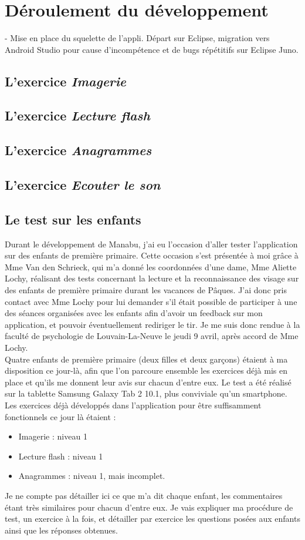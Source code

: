 \section{Déroulement du développement}
- Mise en place du squelette de l'appli. Départ sur Eclipse, migration vers Android Studio pour cause d'incompétence et de bugs répétitifs sur Eclipse Juno.

\subsection{L'exercice \textit{Imagerie}}
\subsection{L'exercice \textit{Lecture flash}}
\subsection{L'exercice \textit{Anagrammes}}
\subsection{L'exercice \textit{Ecouter le son}}
\subsection{Le test sur les enfants}
Durant le développement de Manabu, j'ai eu l'occasion d'aller tester l'application sur des enfants de première primaire. Cette occasion s'est présentée à moi grâce à Mme Van den Schrieck, qui m'a donné les coordonnées d'une dame, Mme Aliette Lochy, réalisant des tests concernant la lecture et la reconnaissance des visage sur des enfants de première primaire durant les vacances de Pâques. J'ai donc pris contact avec Mme Lochy pour lui demander s'il était possible de participer à une des séances organisées avec les enfants afin d'avoir un feedback sur mon application, et pouvoir éventuellement rediriger le tir. Je me suis donc rendue à la faculté de psychologie de Louvain-La-Neuve le jeudi 9 avril, après accord de Mme Lochy.\\

Quatre enfants de première primaire (deux filles et deux garçons) étaient à ma disposition ce jour-là, afin que l'on parcoure ensemble les exercices déjà mis en place et qu'ils me donnent leur avis sur chacun d'entre eux. Le test a été réalisé sur la tablette Samsung Galaxy Tab 2 10.1, plus conviviale qu'un smartphone. Les exercices déjà développés dans l'application pour être suffisamment fonctionnels ce jour là étaient :
\begin{itemize}
\item Imagerie : niveau 1
\item Lecture flash : niveau 1
\item Anagrammes : niveau 1, mais incomplet.
\end{itemize}
Je ne compte pas détailler ici ce que m'a dit chaque enfant, les commentaires étant très similaires pour chacun d'entre eux. Je vais expliquer ma procédure de test, un exercice à la fois, et détailler par exercice les questions posées aux enfants ainsi que les réponses obtenues.


